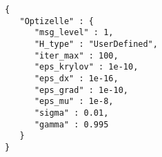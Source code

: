 \begin{lstlisting}[style=json,caption={Optizelle uses this input specification to minimize the inequality constrained problem specified in Listing \ref{lst:simpleIneq}.  We explain this specification Chapter \ref{ch:Input}.},label=lst:simpleIneqJSON]
{
   "Optizelle" : {
      "msg_level" : 1,
      "H_type" : "UserDefined",
      "iter_max" : 100,
      "eps_krylov" : 1e-10,
      "eps_dx" : 1e-16,
      "eps_grad" : 1e-10,
      "eps_mu" : 1e-8,
      "sigma" : 0.01,
      "gamma" : 0.995
   }
}
\end{lstlisting}
